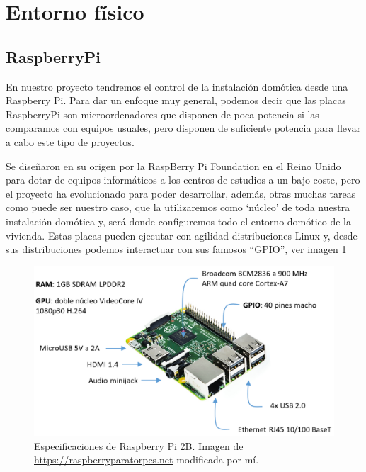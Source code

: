 \section{Entorno físico}
\subsection{RaspberryPi}
En nuestro proyecto tendremos el control de la instalación domótica desde una Raspberry Pi\cite{misc:RbPWeb}. 
Para dar un enfoque muy general, podemos decir que las placas RaspberryPi\cite{misc:RbPWeb} son microordenadores que disponen de poca potencia si las comparamos con equipos usuales, pero disponen de suficiente potencia para llevar a cabo este tipo de proyectos.

Se diseñaron en su origen por la RaspBerry Pi Foundation\cite{misc:RbPWeb} en el Reino Unido para dotar de equipos informáticos a los centros de estudios a un bajo coste, pero el proyecto ha evolucionado para poder desarrollar, además, otras muchas tareas como puede ser nuestro caso, que la utilizaremos como ‘núcleo’ de toda nuestra instalación domótica y, será donde configuremos todo el entorno domótico de la vivienda.
Estas placas pueden ejecutar con agilidad distribuciones Linux\cite{misc:Linux} y, desde sus distribuciones podemos interactuar con sus famosos “GPIO”, ver imagen \ref{Img:Especificaciones RBP2B}

\begin{figure}
    \centering
    \includegraphics[width=\textwidth]{img/RBP2B.pdf}
    \caption{Especificaciones de Raspberry Pi 2B. Imagen de \url{https://raspberryparatorpes.net} modificada por mí\cite{wiki:Creative}. }\label{Img:Especificaciones RBP2B}
\end{figure}

